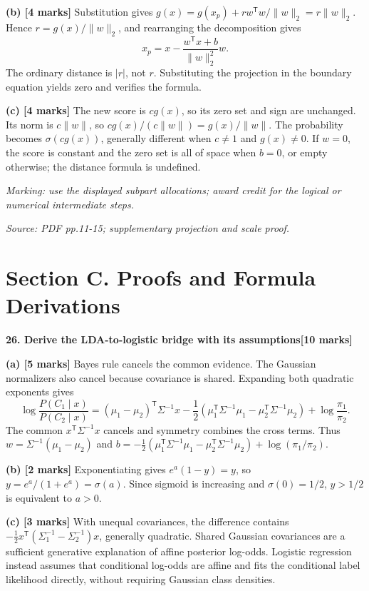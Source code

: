 \documentclass[11pt,a4paper]{article}
\begin{document}
\textbf{(b) [4 marks]} Substitution gives \(g(x)=g(x_p)+r w^{\mathsf T}w/\|w\|_2=r\|w\|_2\). Hence \(r=g(x)/\|w\|_2\), and rearranging the decomposition gives \[x_p=x-\frac{w^{\mathsf T}x+b}{\|w\|_2^2}w.\] The ordinary distance is \(|r|\), not \(r\). Substituting the projection in the boundary equation yields zero and verifies the formula.

\textbf{(c) [4 marks]} The new score is \(cg(x)\), so its zero set and sign are unchanged. Its norm is \(c\|w\|\), so \(cg(x)/(c\|w\|)=g(x)/\|w\|\). The probability becomes \(\sigma(cg(x))\), generally different when \(c\ne1\) and \(g(x)\ne0\). If \(w=0\), the score is constant and the zero set is all of space when \(b=0\), or empty otherwise; the distance formula is undefined.

\textit{Marking: use the displayed subpart allocations; award credit for the logical or numerical intermediate steps.}\par
{\footnotesize\textit{Source: PDF pp.11-15; supplementary projection and scale proof.}}
\newpage\section*{Section C. Proofs and Formula Derivations}
\textbf{26. Derive the LDA-to-logistic bridge with its assumptions}\hfill\textbf{[10 marks]}\par\medskip
\textbf{(a) [5 marks]} Bayes rule cancels the common evidence. The Gaussian normalizers also cancel because covariance is shared. Expanding both quadratic exponents gives \[\log\frac{P(C_1\mid x)}{P(C_2\mid x)}=(\mu_1-\mu_2)^{\mathsf T}\Sigma^{-1}x-\frac12(\mu_1^{\mathsf T}\Sigma^{-1}\mu_1-\mu_2^{\mathsf T}\Sigma^{-1}\mu_2)+\log\frac{\pi_1}{\pi_2}.\] The common \(x^{\mathsf T}\Sigma^{-1}x\) cancels and symmetry combines the cross terms. Thus \(w=\Sigma^{-1}(\mu_1-\mu_2)\) and \(b=-\tfrac12(\mu_1^{\mathsf T}\Sigma^{-1}\mu_1-\mu_2^{\mathsf T}\Sigma^{-1}\mu_2)+\log(\pi_1/\pi_2)\).

\textbf{(b) [2 marks]} Exponentiating gives \(e^a(1-y)=y\), so \(y=e^a/(1+e^a)=\sigma(a)\). Since sigmoid is increasing and \(\sigma(0)=1/2\), \(y>1/2\) is equivalent to \(a>0\).

\textbf{(c) [3 marks]} With unequal covariances, the difference contains \(-\tfrac12 x^{\mathsf T}(\Sigma_1^{-1}-\Sigma_2^{-1})x\), generally quadratic. Shared Gaussian covariances are a sufficient generative explanation of affine posterior log-odds. Logistic regression instead assumes that conditional log-odds are affine and fits the conditional label likelihood directly, without requiring Gaussian class densities.
\end{document}

